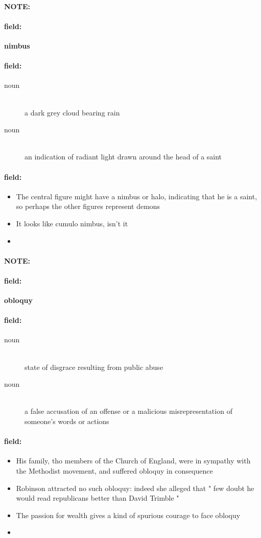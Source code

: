 \documentclass[12pt]{article}
\newenvironment{note}{\paragraph{NOTE:}}{}
\newenvironment{field}{\paragraph{field:}}{}
\begin{document}
\begin{note}
\begin{field}
\textbf{\large nimbus}
\end{field}


\begin{field}
\begin{description}
\item[noun] \hfill \\ 
a dark grey cloud bearing rain

\item[noun] \hfill \\ 
an indication of radiant light drawn around the head of a saint

\end{description}
\end{field}

\begin{field}
\begin{itemize}
\item The central figure might have a nimbus or halo, indicating that he is a saint, so perhaps the other figures represent demons
\item It looks like cumulo nimbus, isn't it
\item 
\end{itemize}
\end{field}
\end{note}
\begin{note}
\begin{field}
\textbf{\large obloquy}
\end{field}


\begin{field}
\begin{description}
\item[noun] \hfill \\ 
state of disgrace resulting from public abuse

\item[noun] \hfill \\ 
a false accusation of an offense or a malicious misrepresentation of someone's words or actions

\end{description}
\end{field}

\begin{field}
\begin{itemize}
\item His family, tho members of the Church of England, were in sympathy with the Methodist movement, and suffered obloquy in consequence
\item Robinson attracted no such obloquy: indeed she alleged that " few doubt he would read republicans better than David Trimble " 
\item The passion for wealth gives a kind of spurious courage to face obloquy
\item 
\end{itemize}
\end{field}
\end{note}
\end{document}
